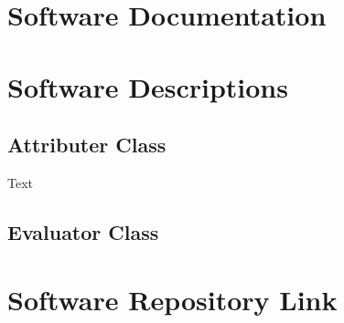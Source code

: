 \documentclass[main]{subfiles}
\begin{document}

\chapter{Software Documentation}


\chapter{Software Descriptions}

\section{Attributer Class}

Text

\section{Evaluator Class}


\chapter{Software Repository Link}
\end{document}
